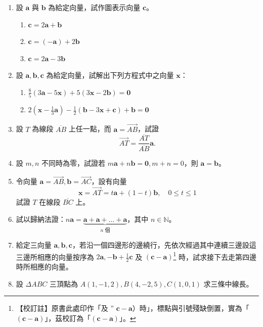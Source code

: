 \begin{enumerate}[label=\arabic*., leftmargin=2em]
  \item 設 $\mathbf{a}$ 與 $\mathbf{b}$ 為給定向量，試作圖表示向量 $\mathbf{c}$。
  \begin{enumerate}[label=(\roman*), leftmargin=2em]
    \item $\mathbf{c} = 2\mathbf{a} + \mathbf{b}$
    \item $\mathbf{c} = (-\mathbf{a}) + 2\mathbf{b}$
    \item $\mathbf{c} = 2\mathbf{a} - 3\mathbf{b}$
  \end{enumerate}
  \item 設 $\mathbf{a}, \mathbf{b}, \mathbf{c}$ 為給定向量，試解出下列方程式中之向量 $\mathbf{x}$：
  \begin{enumerate}[label=(\roman*), leftmargin=2em]
    \item $\frac{8}{5}(3\mathbf{a} - 5\mathbf{x}) + 5(3\mathbf{x} - 2\mathbf{b}) = \mathbf{0}$
    \item $2\left(\mathbf{x} - \frac{1}{3}\mathbf{a}\right) - \frac{1}{2}(\mathbf{b} - 3\mathbf{x} + \mathbf{c}) + \mathbf{b} = \mathbf{0}$
  \end{enumerate}
  \item 設 $T$ 為線段 $\overline{AB}$ 上任一點，而 $\mathbf{a} = \vec{AB}$，試證
  \[ \vec{AT} = \frac{\overline{AT}}{\overline{AB}}\mathbf{a}. \]
  \item 設 $m, n$ 不同時為零，試證若 $m\mathbf{a} + n\mathbf{b} = \mathbf{0}, m + n = 0$，則 $\mathbf{a} = \mathbf{b}$。
  \item 令向量 $\mathbf{a} = \vec{AB}, \mathbf{b} = \vec{AC}$，設有向量
  \[ \mathbf{x} = \vec{AT} = t\mathbf{a} + (1 - t)\mathbf{b}, \quad 0 \le t \le 1 \]
  試證 $T$ 在線段 $\overline{BC}$ 上。
  \item 試以歸納法證：$n\mathbf{a} = \underbrace{\mathbf{a} + \mathbf{a} + \dots + \mathbf{a}}_{n\text{ 個}}$，其中 $n \in \mathbb{N}$。
  \item {}\label{note:b3s-ch3-p104-prob7-typo}%
  給定三向量 $\mathbf{a}, \mathbf{b}, \mathbf{c}$，若沿一個四邊形的邊繞行，先依次經過其中連續三邊設這三邊所相應的向量按序為 $2\mathbf{a}, -\mathbf{b} + \frac{1}{2}\mathbf{c}$ 及 $(\mathbf{c} - \mathbf{a})$\footnote{【校訂註】原書此處印作「及 $\text{'' }\mathbf{c}-\mathbf{a}$）時」，標點與引號殘缺倒置，實為「$(\mathbf{c}-\mathbf{a})$」，茲校訂為「$(\mathbf{c}-\mathbf{a})$」。} 時，試求接下去走第四邊時所相應的向量。
  \item 設 $\Delta ABC$ 三頂點為 $A(1, -1, 2), B(4, -2, 5), C(1, 0, 1)$ 求三條中線長。

\end{enumerate}
